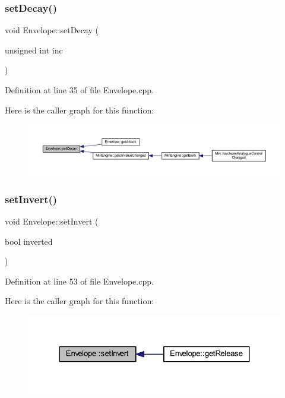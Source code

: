 \subsubsection{\texorpdfstring{set\+Decay()}{setDecay()}}
{\footnotesize\ttfamily void Envelope\+::set\+Decay (\begin{DoxyParamCaption}\item[{unsigned int}]{inc }\end{DoxyParamCaption})}



Definition at line 35 of file Envelope.\+cpp.

Here is the caller graph for this function\+:
\nopagebreak
\begin{figure}[H]
\begin{center}
\leavevmode
\includegraphics[width=350pt]{d7/df3/class_envelope_a5ce19b4d570637216cfd8b0c31447d84_icgraph}
\end{center}
\end{figure}
\mbox{\label{class_envelope_a53797bfa27b46f417ec36f204b9cfecf}} 
\subsubsection{\texorpdfstring{set\+Invert()}{setInvert()}}
{\footnotesize\ttfamily void Envelope\+::set\+Invert (\begin{DoxyParamCaption}\item[{bool}]{inverted }\end{DoxyParamCaption})}



Definition at line 53 of file Envelope.\+cpp.

Here is the caller graph for this function\+:
\nopagebreak
\begin{figure}[H]
\begin{center}
\leavevmode
\includegraphics[width=324pt]{d7/df3/class_envelope_a53797bfa27b46f417ec36f204b9cfecf_icgraph}
\end{center}
\end{figure}
\mbox{\label{class_envelope_a7102e88984b79766c6e9dc4a3c7e278d}} 

